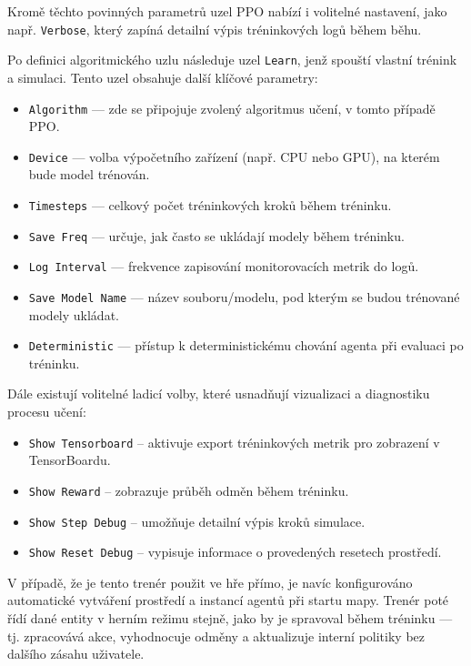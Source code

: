 Kromě těchto povinných parametrů uzel PPO nabízí i volitelné nastavení, jako např. \texttt{Verbose}, který zapíná detailní výpis tréninkových logů během běhu.

\newpage

Po definici algoritmického uzlu následuje uzel \texttt{Learn}, jenž spouští vlastní trénink a simulaci. Tento uzel obsahuje další klíčové parametry:

\begin{itemize}
    \item \texttt{Algorithm} — zde se připojuje zvolený algoritmus učení, v tomto případě PPO.
    \item \texttt{Device} — volba výpočetního zařízení (např. CPU nebo GPU), na kterém bude model trénován.
    \item \texttt{Timesteps} — celkový počet tréninkových kroků během tréninku.
    \item \texttt{Save Freq} — určuje, jak často se ukládají modely během tréninku.
    \item \texttt{Log Interval} — frekvence zapisování monitorovacích metrik do logů.
    \item \texttt{Save Model Name} — název souboru/modelu, pod kterým se budou trénované modely ukládat.
    \item \texttt{Deterministic} — přístup k deterministickému chování agenta při evaluaci po tréninku.
\end{itemize}

Dále existují volitelné ladicí volby, které usnadňují vizualizaci a diagnostiku procesu učení:
\begin{itemize}
    \item \texttt{Show Tensorboard} – aktivuje export tréninkových metrik pro zobrazení v TensorBoardu.
    \item \texttt{Show Reward} – zobrazuje průběh odměn během tréninku.
    \item \texttt{Show Step Debug} – umožňuje detailní výpis kroků simulace.
    \item \texttt{Show Reset Debug} – vypisuje informace o provedených resetech prostředí.
\end{itemize}

V případě, že je tento trenér použit ve hře přímo, je navíc konfigurováno automatické vytváření prostředí a instancí agentů při startu mapy. Trenér poté řídí dané entity v herním režimu stejně, jako by je spravoval během tréninku — tj. zpracovává akce, vyhodnocuje odměny a aktualizuje interní politiky bez dalšího zásahu uživatele.


